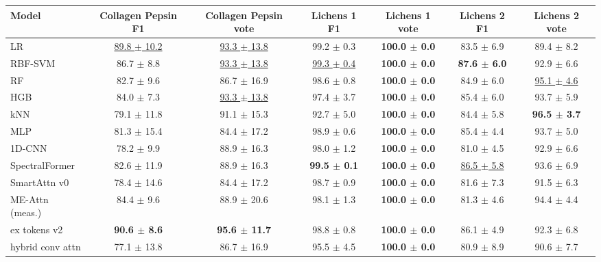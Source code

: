 \small
\begin{tabular}{lcccccc}
\toprule
Model & Collagen Pepsin F1 & Collagen Pepsin vote & Lichens 1 F1 & Lichens 1 vote & Lichens 2 F1 & Lichens 2 vote \\
\midrule
LR & \underline{89.8 $\pm$ 10.2} & \underline{93.3 $\pm$ 13.8} & 99.2 $\pm$ 0.3 & \textbf{100.0 $\pm$ 0.0} & 83.5 $\pm$ 6.9 & 89.4 $\pm$ 8.2 \\
RBF-SVM & 86.7 $\pm$ 8.8 & \underline{93.3 $\pm$ 13.8} & \underline{99.3 $\pm$ 0.4} & \textbf{100.0 $\pm$ 0.0} & \textbf{87.6 $\pm$ 6.0} & 92.9 $\pm$ 6.6 \\
RF & 82.7 $\pm$ 9.6 & 86.7 $\pm$ 16.9 & 98.6 $\pm$ 0.8 & \textbf{100.0 $\pm$ 0.0} & 84.9 $\pm$ 6.0 & \underline{95.1 $\pm$ 4.6} \\
HGB & 84.0 $\pm$ 7.3 & \underline{93.3 $\pm$ 13.8} & 97.4 $\pm$ 3.7 & \textbf{100.0 $\pm$ 0.0} & 85.4 $\pm$ 6.0 & 93.7 $\pm$ 5.9 \\
kNN & 79.1 $\pm$ 11.8 & 91.1 $\pm$ 15.3 & 92.7 $\pm$ 5.0 & \textbf{100.0 $\pm$ 0.0} & 84.4 $\pm$ 5.8 & \textbf{96.5 $\pm$ 3.7} \\
MLP & 81.3 $\pm$ 15.4 & 84.4 $\pm$ 17.2 & 98.9 $\pm$ 0.6 & \textbf{100.0 $\pm$ 0.0} & 85.4 $\pm$ 4.4 & 93.7 $\pm$ 5.0 \\
1D-CNN & 78.2 $\pm$ 9.9 & 88.9 $\pm$ 16.3 & 98.0 $\pm$ 1.2 & \textbf{100.0 $\pm$ 0.0} & 81.0 $\pm$ 4.5 & 92.9 $\pm$ 6.6 \\
SpectralFormer & 82.6 $\pm$ 11.9 & 88.9 $\pm$ 16.3 & \textbf{99.5 $\pm$ 0.1} & \textbf{100.0 $\pm$ 0.0} & \underline{86.5 $\pm$ 5.8} & 93.6 $\pm$ 6.9 \\
\midrule
SmartAttn v0 & 78.4 $\pm$ 14.6 & 84.4 $\pm$ 17.2 & 98.7 $\pm$ 0.9 & \textbf{100.0 $\pm$ 0.0} & 81.6 $\pm$ 7.3 & 91.5 $\pm$ 6.3 \\
ME-Attn (meas.) & 84.4 $\pm$ 9.6 & 88.9 $\pm$ 20.6 & 98.1 $\pm$ 1.3 & \textbf{100.0 $\pm$ 0.0} & 81.3 $\pm$ 4.6 & 94.4 $\pm$ 4.4 \\
ex tokens v2 & \textbf{90.6 $\pm$ 8.6} & \textbf{95.6 $\pm$ 11.7} & 98.8 $\pm$ 0.8 & \textbf{100.0 $\pm$ 0.0} & 86.1 $\pm$ 4.9 & 92.3 $\pm$ 6.8 \\
hybrid conv attn & 77.1 $\pm$ 13.8 & 86.7 $\pm$ 16.9 & 95.5 $\pm$ 4.5 & \textbf{100.0 $\pm$ 0.0} & 80.9 $\pm$ 8.9 & 90.6 $\pm$ 7.7 \\
\bottomrule
\end{tabular}

